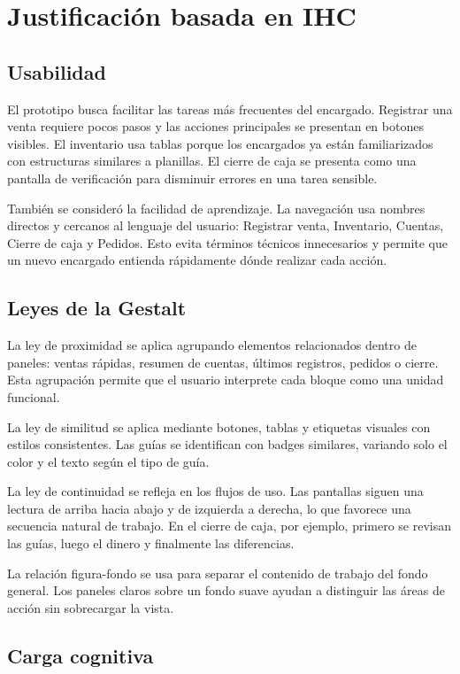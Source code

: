 ﻿\documentclass[12pt,letterpaper]{article}
\begin{document}
\section{Justificación basada en IHC}

\subsection{Usabilidad}

El prototipo busca facilitar las tareas más frecuentes del encargado. Registrar una venta requiere pocos pasos y las acciones principales se presentan en botones visibles. El inventario usa tablas porque los encargados ya están familiarizados con estructuras similares a planillas. El cierre de caja se presenta como una pantalla de verificación para disminuir errores en una tarea sensible.

También se consideró la facilidad de aprendizaje. La navegación usa nombres directos y cercanos al lenguaje del usuario: Registrar venta, Inventario, Cuentas, Cierre de caja y Pedidos. Esto evita términos técnicos innecesarios y permite que un nuevo encargado entienda rápidamente dónde realizar cada acción.

\subsection{Leyes de la Gestalt}

La ley de proximidad se aplica agrupando elementos relacionados dentro de paneles: ventas rápidas, resumen de cuentas, últimos registros, pedidos o cierre. Esta agrupación permite que el usuario interprete cada bloque como una unidad funcional.

La ley de similitud se aplica mediante botones, tablas y etiquetas visuales con estilos consistentes. Las guías se identifican con badges similares, variando solo el color y el texto según el tipo de guía.

La ley de continuidad se refleja en los flujos de uso. Las pantallas siguen una lectura de arriba hacia abajo y de izquierda a derecha, lo que favorece una secuencia natural de trabajo. En el cierre de caja, por ejemplo, primero se revisan las guías, luego el dinero y finalmente las diferencias.

La relación figura-fondo se usa para separar el contenido de trabajo del fondo general. Los paneles claros sobre un fondo suave ayudan a distinguir las áreas de acción sin sobrecargar la vista.

\subsection{Carga cognitiva}
\end{document}
